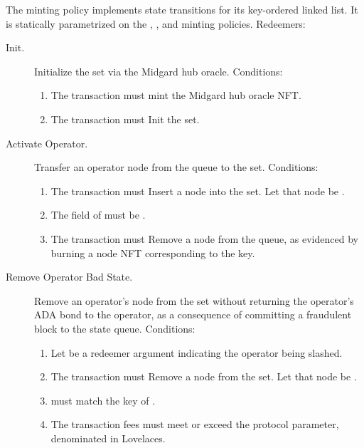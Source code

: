 \documentclass[../midgard.tex]{subfiles}
\begin{document}
The  minting policy implements state transitions for its key-ordered linked list.
It is statically parametrized on the , , and  minting policies.
Redeemers:
\begin{description}
    \item[Init.] Initialize the  set via the Midgard hub oracle.
      Conditions:
        \begin{enumerate}
            \item The transaction must mint the Midgard hub oracle NFT.
            \item The transaction must Init the  set.
        \end{enumerate}
    \item[Activate Operator.] Transfer an operator node from the  queue to the  set.
      Conditions:
        \begin{enumerate}
            \item The transaction must Insert a node into the  set.
              Let that node be .
            \item The  field of  must be .
            \item The transaction must Remove a node from the  queue, as evidenced by burning a  node NFT corresponding to the  key.
        \end{enumerate}
    \item[Remove Operator Bad State.] Remove an operator's node from the  set without returning the operator's ADA bond to the operator, as a consequence of committing a fraudulent block to the state queue.
      Conditions:
        \begin{enumerate}
            \item Let  be a redeemer argument indicating the operator being slashed.
            \item The transaction must Remove a node from the  set.
              Let that node be .
            \item {} must match the key of .
            \item The transaction fees must meet or exceed the  protocol parameter, denominated in Lovelaces.

\end{enumerate}
\end{description}
\end{document}
